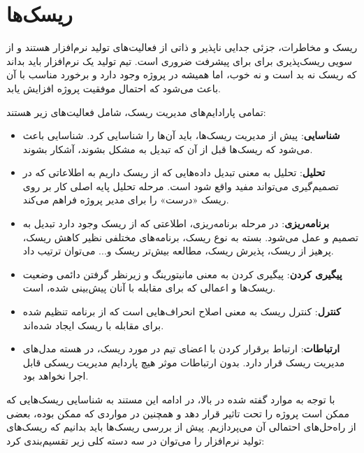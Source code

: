 
\chapter{ریسک‌ها}

ریسک و مخاطرات، جزئی جدایی ناپذیر و ذاتی از فعالیت‌های تولید نرم‌افزار هستند و از سویی ریسک‌پذیری برای برای پیشرفت ضروری است. تیم تولید یک نرم‌افزار باید بداند که ریسک نه بد است و نه خوب، اما همیشه در پروژه وجود دارد و برخورد مناسب با آن باعث می‌شود که احتمال موفقیت پروژه افزایش یابد.


تمامی پارادایم‌های مدیریت ریسک، شامل فعالیت‌های زیر هستند:

\begin{itemize}
	\item
	 \textbf{شناسایی}:
 پیش از مدیریت ریسک‌ها، باید آن‌ها را شناسایی کرد. شناسایی باعث می‌شود که ریسک‌ها قبل از آن‌ که تبدیل به مشکل بشوند، آشکار بشوند. 
	 
	 \item
	 \textbf{تحلیل}:
 تحلیل به معنی تبدیل داده‌هایی که از ریسک داریم به اطلاعاتی که در تصمیم‌گیری می‌تواند مفید واقع شود است. مرحله تحلیل پایه اصلی کار بر روی ریسک «درست» را برای مدیر پروژه فراهم می‌کند.
	 
	 \item 
	 \textbf{برنامه‌ریزی}:
 در مرحله برنامه‌ریزی، اطلاعتی که از ریسک وجود دارد تبدیل به تصمیم و عمل می‌شود. بسته به نوع ریسک،  برنامه‌های مختلفی نظیر کاهش ریسک، پرهیز از ریسک، پذیرش ریسک، مطالعه بیش‌تر ریسک و... می‌توان ترتیب داد.
	 
	 \item
	\textbf{پیگیری کردن}:
پیگیری کردن به معنی مانیتورینگ و زیرنظر گرفتن دائمی وضعیت ریسک‌ها و اعمالی که برای مقابله با آنان پیش‌بینی شده،‌ است.
	 
	 \item 
	\textbf{کنترل}:
 کنترل ریسک به معنی اصلاح انحراف‌هایی است که از برنامه تنظیم شده برای مقابله با ریسک ایجاد شده‌اند.
	 
	 \item
	\textbf{ارتباطات}:
 ارتباط برقرار کردن با اعضای تیم در مورد ریسک، در هسته مدل‌های مدیریت ریسک قرار دارد. بدون ارتباطات موثر هیچ پاردایم مدیریت ریسکی قابل اجرا نخواهد بود.
	 
\end{itemize}


با توجه به موارد گفته شده در بالا، در ادامه این مستند به شناسایی ریسک‌هایی که ممکن است پروژه را تحت تاثیر قرار دهد و همچنین در مواردی که ممکن بوده، بعضی از راه‌حل‌های احتمالی آن می‌پردازیم. پیش از بررسی ریسک‌ها باید بدانیم که ریسک‌های تولید نرم‌افزار را می‌توان در سه دسته کلی زیر تقسیم‌بندی کرد:

